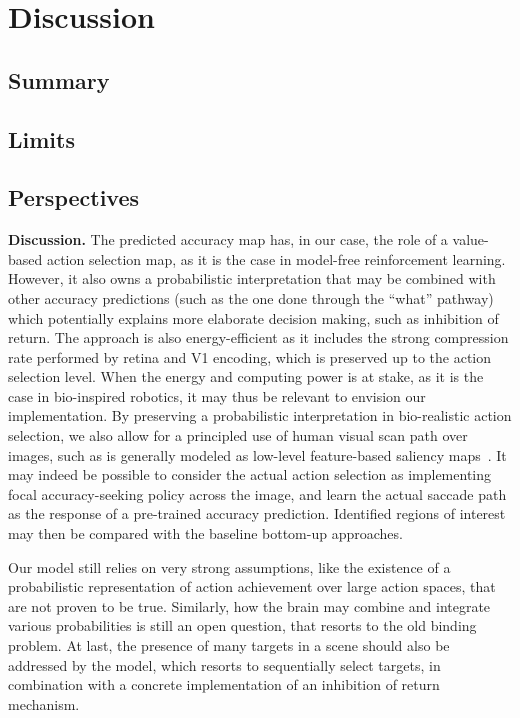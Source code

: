 \CNS
\section{Discussion}
\label{sec:discussion}

\subsection{Summary}

\subsection{Limits}

\subsection{Perspectives}
\else
\textbf{Discussion. }
The predicted accuracy map has, in our case, the role of a value-based action selection map, as it is the case in model-free reinforcement learning. However, it also owns a probabilistic interpretation that may be combined with other accuracy predictions (such as the one done through the ``what'' pathway) which potentially explains more elaborate decision making, such as inhibition of return. The approach is also energy-efficient as it includes the strong compression rate performed by retina and V1 encoding, which is preserved up to the action selection level. When the energy and computing power is at stake, as it is the case in bio-inspired robotics, it may thus be relevant to envision our implementation. By preserving a probabilistic interpretation in bio-realistic action selection, we also allow for a principled use of human visual scan path over images, such as is generally modeled as low-level feature-based saliency maps~\citep{Itti01}. It may indeed be possible to consider the actual action selection as implementing focal accuracy-seeking policy across the image, and learn the actual saccade path as the response of a pre-trained accuracy prediction. Identified regions of interest may then be compared with the baseline bottom-up approaches.

Our model still relies on very strong assumptions, like the existence of a probabilistic representation of action achievement over large action spaces, that are not proven to be true. Similarly, how the brain may combine and integrate various probabilities is still an open question, that resorts to the old binding problem. %
At last, the presence of many targets in a scene should also be addressed by the model, which resorts to sequentially select targets, in combination with a concrete implementation of an inhibition of return mechanism.   

\fi
